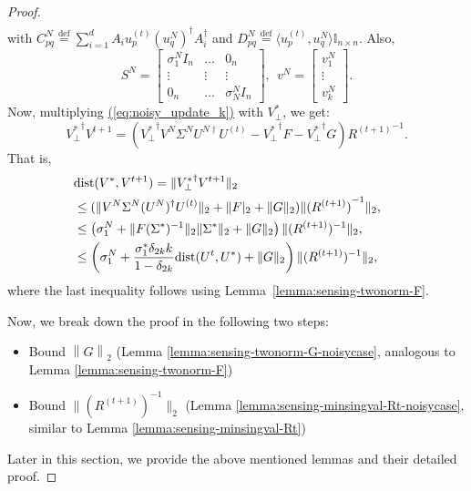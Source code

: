 \documentclass[11pt]{article}
\renewcommand{\eqref}[1]{\hyperref[#1]{(\ref*{#1})}}
\theoremstyle{plain}
\theoremstyle{definition}
\newcommand{\iprod}[2]{\langle #1, #2 \rangle}
\newcommand{\eqdef}{\stackrel{\textrm{def}}{=}}
\newcommand{\dist}{\mathrm{dist}}
\newcommand{\twonorm}[1]{\left\| {#1} \right\|_2}
\newcommand{\Vt}{V^{t+1}}
\newcommand{\Ut}{U^{t}}
\newcommand{\Rt}{R^{(t+1)}}
\newcommand{\Vo}{V^*}
\newcommand{\So}{\Sigma^*}
\newcommand{\Uo}{U^*}
\newcommand{\Un}{U^N}
\newcommand{\Vn}{V^N}
\newcommand{\Sn}{\Sigma^N}
\newcommand{\sn}{\sigma^N}
\begin{document}
\begin{proof}
\begin{align*}
\end{align*}
with $C_{pq}^N \eqdef \sum_{i=1}^d A_i u_p^{(t)}{(u^N_q)}^\dag  A_i^\dag $ and $D_{pq}^N \eqdef \iprod{u_p^{(t)}}{u^N_q}\mathbb{I}_{n\times n}$.
Also, $$S^N=\left[\begin{matrix}\sn_1I_{n}&\dots&0_{n}\\\vdots&\vdots&\vdots\\0_n&\dots&\sn_NI_n\end{matrix}\right],\ \  v^N=\left[\begin{matrix}v^N_1\\\vdots\\v_k^N\end{matrix}\right].$$
Now, multiplying \eqref{eq:noisy_update_k} with $\Vo_\perp$, we get:
\begin{equation*}
{V_{\perp}^*}^\dag \Vt =  ({V_{\perp}^*}^\dag \Vn \Sn U^{N{\dag}}U^{(t)}- {V_{\perp}^*}^\dag  F - {V_{\perp}^*}^\dag  G) {\Rt}^{-1}.%
\end{equation*}
That is,%
\begin{align}
&\hspace*{-15pt}\dist(\Vo, \Vt)=\|{V_{\perp}^*}^\dag \Vt\|_2\nonumber\\&\hspace*{-15pt}\leq (\| \Vn \Sn (\Un)^{\dag}U^{(t)}\|_2+ \|F |_2 + \| G\|_2) \|{(\Rt)}^{-1}\|_2,\nonumber\\
&\hspace*{-15pt}\leq \left(\sn_1+ \|F(\So)^{-1}\|_2\|\So\|_2 + \| G\|_2\right) \|({\Rt})^{-1}\|_2, \nonumber\\
&\hspace*{-15pt}\leq \left(\sn_1+\frac{\sigma_1^*\delta_{2k}k}{1-\delta_{2k}}\dist(\Ut, \Uo) + \| G\|_2\right) \|({\Rt})^{-1}\|_2,\label{eq:dist_noisy_1}
\end{align}
where the last inequality follows using Lemma~\ref{lemma:sensing-twonorm-F}. 

Now, we break down the proof in the following two steps:
\begin{itemize}
\item Bound $\twonorm{G}$ (Lemma \ref{lemma:sensing-twonorm-G-noisycase}, analogous to Lemma \ref{lemma:sensing-twonorm-F})
\item Bound $\|({\Rt})^{-1}\|_2$ (Lemma \ref{lemma:sensing-minsingval-Rt-noisycase}, similar to Lemma \ref{lemma:sensing-minsingval-Rt})
\end{itemize}
Later in this section, we provide the above mentioned lemmas and their detailed proof. 


\end{proof}
\end{document}
